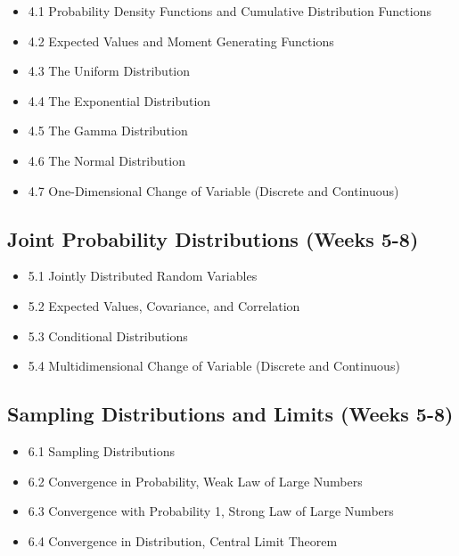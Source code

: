 \documentclass[]{book}
\providecommand{\tightlist}{%
  \setlength{\itemsep}{0pt}\setlength{\parskip}{0pt}}
\providecommand{\tightlist}{%
  \setlength{\itemsep}{0pt}\setlength{\parskip}{0pt}}
\theoremstyle{definition}
\theoremstyle{definition}
\theoremstyle{definition}
\theoremstyle{remark}
\begin{document}
\begin{itemize}
\tightlist
\item
  4.1 Probability Density Functions and Cumulative Distribution
  Functions\\
\item
  4.2 Expected Values and Moment Generating Functions\\
\item
  4.3 The Uniform Distribution\\
\item
  4.4 The Exponential Distribution\\
\item
  4.5 The Gamma Distribution\\
\item
  4.6 The Normal Distribution\\
\item
  4.7 One-Dimensional Change of Variable (Discrete and Continuous)
\end{itemize}

\subsection*{Joint Probability Distributions (Weeks
5-8)}\label{joint-probability-distributions-weeks-5-8}

\begin{itemize}
\tightlist
\item
  5.1 Jointly Distributed Random Variables
\item
  5.2 Expected Values, Covariance, and Correlation
\item
  5.3 Conditional Distributions
\item
  5.4 Multidimensional Change of Variable (Discrete and Continuous)
\end{itemize}

\subsection*{Sampling Distributions and Limits (Weeks
5-8)}\label{sampling-distributions-and-limits-weeks-5-8}

\begin{itemize}
\tightlist
\item
  6.1 Sampling Distributions
\item
  6.2 Convergence in Probability, Weak Law of Large Numbers
\item
  6.3 Convergence with Probability 1, Strong Law of Large Numbers\\
\item
  6.4 Convergence in Distribution, Central Limit Theorem
\end{itemize}
\end{document}
